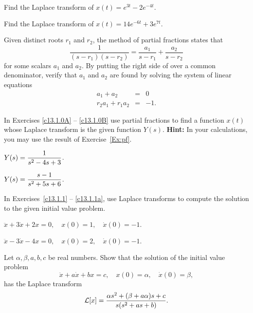 \EXER

\TEXER

\begin{exercise} \label{c13.1.0a}
Find the Laplace transform of $x(t)=e^{3t}-2e^{-4t}$.
\end{exercise}

\begin{exercise} \label{c13.1.0b}
Find the Laplace transform of $x(t)=14e^{-6t}+3e^{7t}$.
\end{exercise}

\begin{exercise}  \label{Ex:pf}
Given distinct roots $r_1$ and $r_2$, the method of partial fractions states 
that 
\begin{equation} \label{E:pfquad}
\frac{1}{(s-r_1)(s-r_2)} = \frac{a_1}{s-r_1} + \frac{a_2}{s-r_2}
\end{equation}
for some scalars $a_1$ and $a_2$.  By putting the right side of 
over a common denominator, verify that $a_1$ and $a_2$ are found by solving 
the system of linear equations
\begin{eqnarray*}
a_1 + a_2 & = & 0\\
r_2a_1 + r_1a_2 & = & -1.
\end{eqnarray*}
\end{exercise}

\noindent In Exercises \ref{c13.1.0A} -- \ref{c13.1.0B} use partial fractions
to find a function $x(t)$ whose Laplace transform is the given function
$Y(s)$.  {\bf Hint:}  In your calculations, you may use the result of 
Exercise~\ref{Ex:pf}.
\begin{exercise} \label{c13.1.0A}
$Y(s) = \displaystyle\frac{1}{s^2-4s+3}$.
\end{exercise}
\begin{exercise} \label{c13.1.0B}
$Y(s) = \displaystyle\frac{s-1}{s^2+5s+6}$.
\end{exercise}


\noindent In Exercises~\ref{c13.1.1} -- \ref{c13.1.1a}, use Laplace transforms 
to compute the solution to the given initial value problem.
\begin{exercise} \label{c13.1.1}
$\ddot{x} + 3\dot{x} + 2x = 0, \quad x(0) = 1, \quad \dot{x}(0) = -1$. 
\end{exercise}
\begin{exercise} \label{c13.1.1a}
$\ddot{x} - 3\dot{x} - 4x = 0, \quad x(0) = 2, \quad \dot{x}(0) = -1$. 
\end{exercise}

\begin{exercise} \label{c13.4.4}
Let $\alpha,\beta,a,b,c$ be real numbers.  Show that the solution
of the initial value problem
\[
\ddot x +a\dot x +b x=c,\quad x(0)=\alpha,\quad \dot x(0)=\beta,
\]
has the Laplace transform
\[
{\cal L}[x] = \frac{\alpha s^2 +(\beta +a\alpha)s+c}{s(s^2+as+b)}.
\]
\end{exercise}

